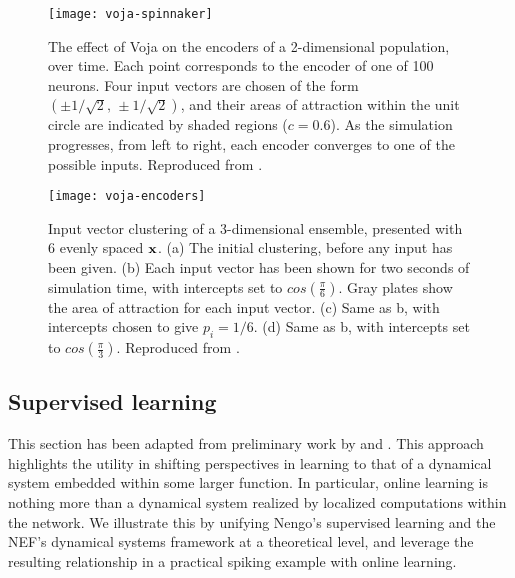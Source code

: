 \begin{figure}
    \centering
  \texttt{[image: voja-spinnaker]}
  \caption{
The effect of Voja on the encoders of a 2-dimensional population, over time.
Each point corresponds to the encoder of one of \num{100} neurons.
Four input vectors are chosen of the form $(\pm 1 / \sqrt{2}, \, \pm 1 / \sqrt{2})$, and their areas of attraction within the unit circle are indicated by shaded regions ($c = 0.6$).
As the simulation progresses, from left to right, each encoder converges to one of the possible inputs.
Reproduced from \citet{knight2016}.
  \label{fig:voja-spinnaker}
    }

  \vspace{1em}

    \texttt{[image: voja-encoders]}
    \caption{Input vector clustering of a 3-dimensional ensemble, presented with 6 evenly spaced $\mathbf{x}$. (a) The initial clustering, before any input has been given. (b) Each input vector has been shown for two seconds of simulation time, with intercepts set to $cos \left(\frac{\pi}{6} \right)$. Gray plates show the area of attraction for each input vector. (c) Same as b, with intercepts chosen to give $p_i = 1/6$. (d) Same as b, with intercepts set to $cos \left(\frac{\pi}{3} \right)$. \label{e3d}
    Reproduced from \citet{voelker2014a}.
       \label{fig:voja-encoders}
    }
\end{figure}

\subsection{Supervised learning}

This section has been adapted from preliminary work by \citet{voelker2015} and \citet{voelker2017c}.
This approach highlights the utility in shifting perspectives in learning to that of a dynamical system embedded within some larger function.
In particular, online learning is nothing more than a dynamical system realized by localized computations within the network.
We illustrate this by unifying Nengo's supervised learning and the NEF's dynamical systems framework at a theoretical level, and leverage the resulting relationship in a practical spiking example with online learning.

